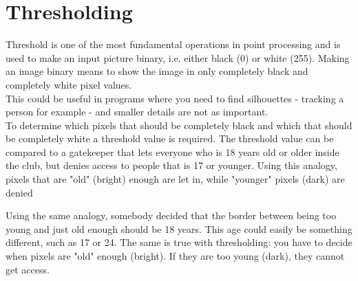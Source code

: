 

   


\section{Thresholding}
\label{sec:Thresholding}
Threshold is one of the most fundamental operations in point processing  and is used to make an input picture binary, i.e. either black (0) or white (255). Making an image binary means to show the image in only completely black and completely white pixel values. \\
This could be useful in programs where you need to find silhouettes - tracking a person for example - and smaller details are not as important. \\
To determine which pixels that should be completely black and which that should be completely white a threshold value is required. The threshold value can be compared to a gatekeeper that lets everyone who is 18 years old or older inside the club, but denies access to people that is 17 or younger. Using this analogy, pixels that are "old" (bright) enough are let in, while "younger" pixels (dark) are denied

Using the same analogy, somebody decided that the border between being too young and just old enough should be 18 years. This age could easily be something different, such as 17 or 24. The same is true with thresholding: you have to decide when pixels are "old" enough (bright). If they are too young (dark), they cannot get access.

